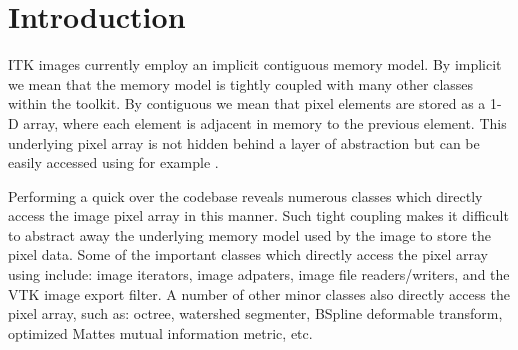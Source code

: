 \documentclass{InsightArticle}
\begin{document}
\section{Introduction}

ITK images currently employ an implicit contiguous memory model.
By implicit we mean that the memory model is tightly coupled with many other
classes within the toolkit.
By contiguous we mean that pixel elements are stored as a 1-D array,
where each element is adjacent in memory to the previous element.
This underlying pixel array is not hidden behind a layer of abstraction but
can be easily accessed using for example .

Performing a quick  over the codebase reveals numerous classes
which directly access the image pixel array in this manner.
Such tight coupling makes it difficult to abstract away the underlying memory
model used by the image to store the pixel data.
Some of the important classes which directly access the pixel array using
 include:
image iterators, image adpaters, image file readers/writers, and the VTK image export filter.
A number of other minor classes also directly access the pixel array, such as:
octree, watershed segmenter, BSpline deformable transform, 
optimized Mattes mutual information metric, etc.
\end{document}
